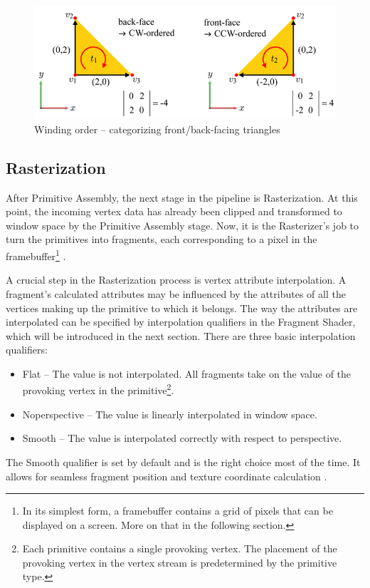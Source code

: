 \documentclass[
  digital,     %
  oneside,     %
  nosansbold,  %
  nocolorbold, %
  lof,         %
  lot,         %
]{fithesis4}
\begin{document}
\begin{figure}[H]
    \centering
    \includegraphics[height=0.32\linewidth]{images/tizen_front_back_face.png}
    \caption{Winding order -- categorizing front/back-facing triangles \cite{tizen-face-culling}}
    \label{fig:tizen-front-back-face}
\end{figure}

\subsection{Rasterization}
After Primitive Assembly, the next stage in the pipeline is Rasterization. At this point, the incoming vertex data
has already been clipped and transformed to window space by the Primitive Assembly stage. Now, it is the Rasterizer's
job to turn the primitives into fragments, each corresponding to a pixel in the framebuffer\footnote{In its simplest
form, a framebuffer contains a grid of pixels that can be displayed on a screen. More on that in the following section.}
\cite[p.14]{opengl-book}.

A crucial step in the Rasterization process is vertex attribute interpolation. A fragment's calculated attributes
may be influenced by the attributes of all the vertices making up the primitive to which it belongs.
The way the attributes are interpolated can be specified by interpolation qualifiers in the Fragment Shader,
which will be introduced in the next section. There are three basic interpolation qualifiers:
\begin{itemize}
    \item Flat -- The value is not interpolated. All fragments take on the value of the provoking vertex
    in the primitive\footnote{Each primitive contains a single provoking vertex.
    The placement of the provoking vertex in the vertex stream is predetermined by the primitive type.}.
    \item Noperspective -- The value is linearly interpolated in window space.
    \item Smooth -- The value is interpolated correctly with respect to perspective.
\end{itemize}
The Smooth qualifier is set by default and is the right choice most of the time. It allows for seamless
fragment position and texture coordinate calculation \cite{openglwiki-interpolation}.
\end{document}

